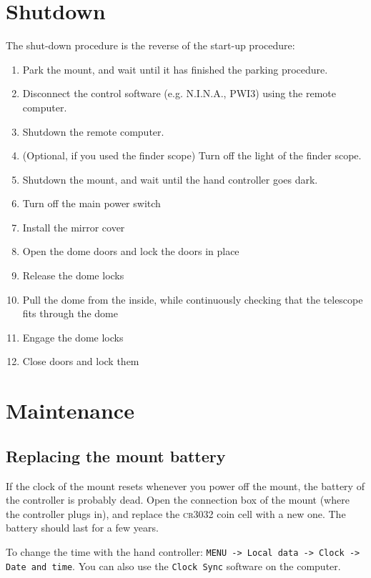 \documentclass[a4paper, 11pt, fleqn]{memoir}
\begin{document}
\section{Shutdown}
\label{shutdown}

The shut-down procedure is the reverse of the start-up procedure:
\begin{enumerate}
    \item Park the mount, and wait until it has finished the parking procedure.
    \item Disconnect the control software (e.g.
          N.I.N.A., PWI3) using the remote computer.
    \item Shutdown the remote computer.
    \item (Optional, if you used the finder scope) Turn off the light of the finder scope.
    \item Shutdown the mount, and wait until the hand controller goes dark.
    \item Turn off the main power switch
    \item Install the mirror cover
    \item Open the dome doors and lock the doors in place
    \item Release the dome locks
    \item Pull the dome from the inside, while continuously checking that the telescope fits through the dome
    \item Engage the dome locks
    \item Close doors and lock them
\end{enumerate}

\section{Maintenance}

\subsection{Replacing the mount battery}
\label{sec:mount-battery-replace}

If the clock of the mount resets whenever you power off the mount, the battery of the controller is probably dead.
Open the connection box of the mount (where the controller plugs in), and replace the \textsc{cr3032} coin cell with a new one.
The battery should last for a few years.

To change the time with the hand controller: \texttt{MENU -> Local data -> Clock -> Date and time}.
You can also use the \texttt{Clock Sync} software on the computer.
\end{document}
